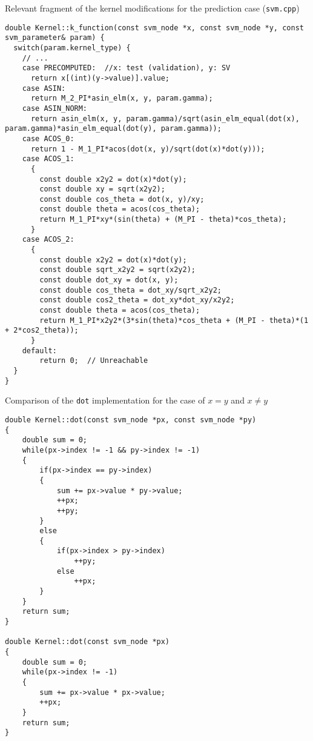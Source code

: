 \begin{listing}
    \caption{Relevant fragment of the kernel modifications for the prediction case (\texttt{svm.cpp})}
    \label{lst:svm_cpp_k_function}
    \begin{verbatim}
double Kernel::k_function(const svm_node *x, const svm_node *y, const svm_parameter& param) {
  switch(param.kernel_type) {
    // ...
    case PRECOMPUTED:  //x: test (validation), y: SV
      return x[(int)(y->value)].value;
    case ASIN:
      return M_2_PI*asin_elm(x, y, param.gamma);
    case ASIN_NORM:
      return asin_elm(x, y, param.gamma)/sqrt(asin_elm_equal(dot(x), param.gamma)*asin_elm_equal(dot(y), param.gamma));
    case ACOS_0:
      return 1 - M_1_PI*acos(dot(x, y)/sqrt(dot(x)*dot(y)));
    case ACOS_1:
      {
        const double x2y2 = dot(x)*dot(y);
        const double xy = sqrt(x2y2);
        const double cos_theta = dot(x, y)/xy;
        const double theta = acos(cos_theta);
        return M_1_PI*xy*(sin(theta) + (M_PI - theta)*cos_theta);
      }
    case ACOS_2:
      {
        const double x2y2 = dot(x)*dot(y);
        const double sqrt_x2y2 = sqrt(x2y2);
        const double dot_xy = dot(x, y);
        const double cos_theta = dot_xy/sqrt_x2y2;
        const double cos2_theta = dot_xy*dot_xy/x2y2;
        const double theta = acos(cos_theta);
        return M_1_PI*x2y2*(3*sin(theta)*cos_theta + (M_PI - theta)*(1 + 2*cos2_theta));
      }
    default:
        return 0;  // Unreachable
  }
}
\end{verbatim}
\end{listing}

\begin{listing}
    \caption{Comparison of the \texttt{dot} implementation for the case of $x = y$ and $x \neq y$}
    \label{lst:dot}
    \begin{verbatim}
double Kernel::dot(const svm_node *px, const svm_node *py)
{
	double sum = 0;
	while(px->index != -1 && py->index != -1)
	{
		if(px->index == py->index)
		{
			sum += px->value * py->value;
			++px;
			++py;
		}
		else
		{
			if(px->index > py->index)
				++py;
			else
				++px;
		}
	}
	return sum;
}

double Kernel::dot(const svm_node *px)
{
	double sum = 0;
	while(px->index != -1)
	{
		sum += px->value * px->value;
		++px;
	}
	return sum;
}
\end{verbatim}
\end{listing}
